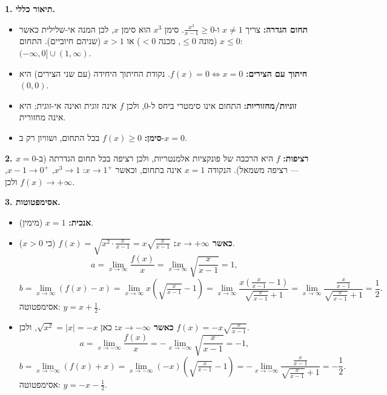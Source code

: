 \begin{solution}
\textbf{1. תיאור כללי.}
\begin{itemize}
  \item \textbf{תחום הגדרה:} צריך $x\neq1$ ו-$\frac{x^3}{x-1}\ge0$. סימן $x^3$ הוא סימן $x$, לכן המנה אי-שלילית כאשר $x\le0$ (מונה $\le0$, מכנה $<0$) או $x>1$ (שניהם חיוביים). התחום: $(-\infty,0]\cup(1,\infty)$.
  \item \textbf{חיתוך עם הצירים:} $f(x)=0\iff x=0$. נקודת החיתוך היחידה (עם שני הצירים) היא $(0,0)$.
  \item \textbf{זוגיות/מחזוריות:} התחום אינו סימטרי ביחס ל-$0$, ולכן $f$ אינה זוגית ואינה אי-זוגית; היא אינה מחזורית.
  \item \textbf{סימן:} $f(x)\ge0$ בכל התחום, ושוויון רק ב-$x=0$.
\end{itemize}

\textbf{2. רציפות:} $f$ היא הרכבה של פונקציות אלמנטריות, ולכן רציפה בכל תחום הגדרתה (ב-$x=0$ — רציפה משמאל). הנקודה $x=1$ אינה בתחום, וכאשר $x\to1^+$: $x^3\to1$, $x-1\to0^+$, ולכן $f(x)\to+\infty$.

\textbf{3. אסימפטוטות.}
\begin{itemize}
  \item \textbf{אנכית:} $x=1$ (מימין).
  \item \textbf{כאשר $x\to+\infty$:} $f(x)=\sqrt{x^2\cdot\frac{x}{x-1}}=x\sqrt{\frac{x}{x-1}}$ (כי $x>0$).
  \[ a=\lim_{x\to\infty}\frac{f(x)}{x}=\lim_{x\to\infty}\sqrt{\frac{x}{x-1}}=1, \]
  \[ b=\lim_{x\to\infty}\left(f(x)-x\right)=\lim_{x\to\infty}x\left(\sqrt{\tfrac{x}{x-1}}-1\right)=\lim_{x\to\infty}\frac{x\left(\frac{x}{x-1}-1\right)}{\sqrt{\frac{x}{x-1}}+1}=\lim_{x\to\infty}\frac{\frac{x}{x-1}}{\sqrt{\frac{x}{x-1}}+1}=\frac{1}{2}. \]
  אסימפטוטה: $y=x+\frac12$.
  \item \textbf{כאשר $x\to-\infty$:} כאן $\sqrt{x^2}=|x|=-x$, ולכן $f(x)=-x\sqrt{\frac{x}{x-1}}$.
  \[ a=\lim_{x\to-\infty}\frac{f(x)}{x}=-\lim_{x\to-\infty}\sqrt{\frac{x}{x-1}}=-1, \]
  \[ b=\lim_{x\to-\infty}\left(f(x)+x\right)=\lim_{x\to-\infty}(-x)\left(\sqrt{\tfrac{x}{x-1}}-1\right)=-\lim_{x\to-\infty}\frac{\frac{x}{x-1}}{\sqrt{\frac{x}{x-1}}+1}=-\frac12. \]
  אסימפטוטה: $y=-x-\frac12$.
\end{itemize}


\end{solution}
